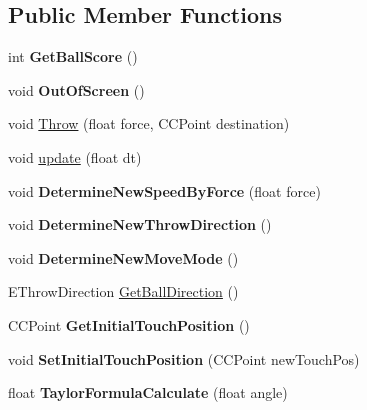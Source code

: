 \subsection*{Public Member Functions}
\begin{DoxyCompactItemize}
\item 
\hypertarget{class_j_g___ball_a421b0c32f767c87d28f48b4f3300bb27}{int {\bfseries Get\-Ball\-Score} ()}\label{class_j_g___ball_a421b0c32f767c87d28f48b4f3300bb27}

\item 
\hypertarget{class_j_g___ball_ab8274d983de168e54e926cd8190e23a7}{void {\bfseries Out\-Of\-Screen} ()}\label{class_j_g___ball_ab8274d983de168e54e926cd8190e23a7}

\item 
void \hyperlink{class_j_g___ball_a58db2f725890ccc7099618aeec121022}{Throw} (float force, C\-C\-Point destination)
\item 
void \hyperlink{class_j_g___ball_a21c06d1a10aa8fdcc3d8e63a82f221fe}{update} (float dt)
\item 
\hypertarget{class_j_g___ball_a3abd1cc11360005856aee7c12df815bc}{void {\bfseries Determine\-New\-Speed\-By\-Force} (float force)}\label{class_j_g___ball_a3abd1cc11360005856aee7c12df815bc}

\item 
\hypertarget{class_j_g___ball_a0f7afc97659a4fd3ede6f48ea96d9480}{void {\bfseries Determine\-New\-Throw\-Direction} ()}\label{class_j_g___ball_a0f7afc97659a4fd3ede6f48ea96d9480}

\item 
\hypertarget{class_j_g___ball_a8c4351fcd5d55294678929982a54d1c6}{void {\bfseries Determine\-New\-Move\-Mode} ()}\label{class_j_g___ball_a8c4351fcd5d55294678929982a54d1c6}

\item 
E\-Throw\-Direction \hyperlink{class_j_g___ball_a94843b91ab6f8cddbb2b90de6daeb531}{Get\-Ball\-Direction} ()
\item 
\hypertarget{class_j_g___ball_a0ad42506b43718f14ccb45f163d92999}{C\-C\-Point {\bfseries Get\-Initial\-Touch\-Position} ()}\label{class_j_g___ball_a0ad42506b43718f14ccb45f163d92999}

\item 
\hypertarget{class_j_g___ball_a628e6f457315f1af9d9638834dff91e0}{void {\bfseries Set\-Initial\-Touch\-Position} (C\-C\-Point new\-Touch\-Pos)}\label{class_j_g___ball_a628e6f457315f1af9d9638834dff91e0}

\item 
\hypertarget{class_j_g___ball_abf717adfb38acc90567e7650d73dd534}{float {\bfseries Taylor\-Formula\-Calculate} (float angle)}\label{class_j_g___ball_abf717adfb38acc90567e7650d73dd534}

\end{DoxyCompactItemize}
